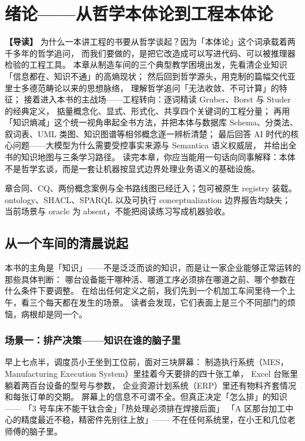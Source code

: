 \chapter{绪论——从哲学本体论到工程本体论}

\begin{introbox}
\textbf{【导读】}
为什么一本讲工程的书要从哲学谈起？因为「本体论」这个词承载着两千多年的哲学追问，
而我们要做的，是把它改造成可以写进代码、可以被推理器检验的工程工具。
本章从制造车间的三个典型教学困境出发，先看清企业知识「信息都在、知识不通」的高熵现状；
然后回到哲学源头，用克制的篇幅交代亚里士多德范畴论以来的思想脉络，
理解哲学追问「无法收敛、不可计算」的特征；
接着进入本书的主战场——工程转向：逐词精读 Gruber、Borst 与 Studer 的经典定义，
掂量概念化、显式、形式化、共享四个关键词的工程分量；
再用「知识熵减」这个统一视角串起全书方法，并把本体与数据库 Schema、分类法、
叙词表、UML 类图、知识图谱等相邻概念逐一辨析清楚；
最后回答 AI 时代的核心问题——大模型为什么需要受控事实来源与 Semantica 语义权威层，
并给出全书的知识地图与三条学习路径。
读完本章，你应当能用一句话向同事解释：本体不是哲学玄谈，而是一套让机器按显式边界处理业务语义的基础设施。
\end{introbox}

{章合同、CQ、两份概念案例与全书路线图已经迁入；包可被原生 registry 装载。}
{ontology、SHACL、SPARQL 以及可执行 conceptualization 边界报告均缺失；
当前场景与 oracle 为 absent，不能把阅读练习写成机器验收。}

\section{从一个车间的清晨说起}

本书的主角是「知识」——不是泛泛而谈的知识，而是让一家企业能够正常运转的那些具体判断：
哪台设备能干哪种活、哪道工序必须排在哪道之前、哪个参数在什么条件下要调整。
在给出任何定义之前，我们先到一个机加工车间里待一个上午，看三个每天都在发生的场景。
读者会发现，它们表面上是三个不同部门的烦恼，病根却是同一个。

\subsection{场景一：排产决策——知识在谁的脑子里}

早上七点半，调度员小王坐到工位前，面对三块屏幕：
制造执行系统（MES，Manufacturing Execution System）里挂着今天要排的四十张工单，
Excel 台账里躺着两百台设备的型号与参数，
企业资源计划系统（ERP）里还有物料齐套情况和每张订单的交期。
屏幕上的信息不可谓不全。但真正决定「怎么排」的知识——
「3 号车床不能干钛合金」「热处理必须排在焊接后面」
「A 区那台加工中心的精度最近不稳，精密件先别往上放」——
不在任何系统里，在小王和几位老师傅的脑子里。

